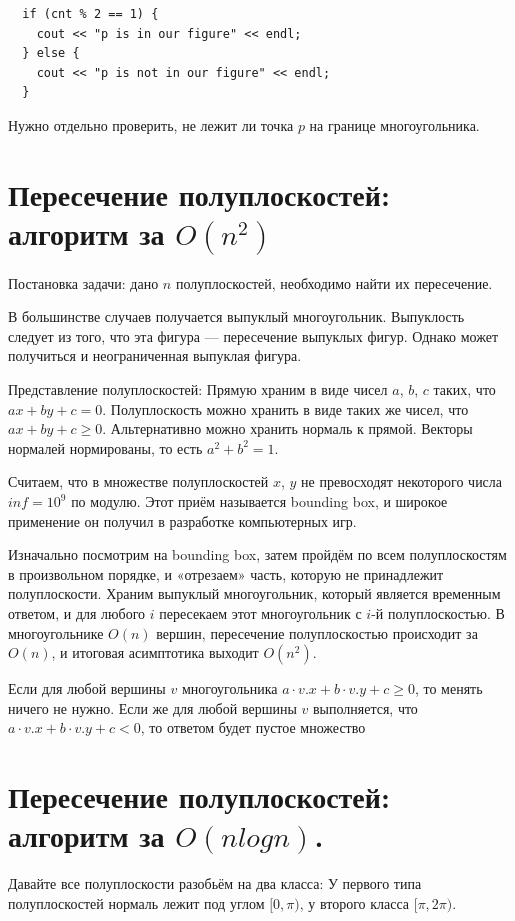 \begin{lstlisting}
  if (cnt % 2 == 1) {
    cout << "p is in our figure" << endl;
  } else {
    cout << "p is not in our figure" << endl;
  }
\end{lstlisting}

\Note Нужно отдельно проверить, не лежит ли точка $p$ на границе многоугольника.
\newpage{}

\section{Пересечение полуплоскостей: алгоритм за $O(n^2)$}
Постановка задачи: дано $n$ полуплоскостей, необходимо найти их пересечение.

В большинстве случаев получается выпуклый многоугольник. Выпуклость следует из того, что эта фигура — пересечение выпуклых фигур. Однако может получиться и неограниченная выпуклая фигура.

Представление полуплоскостей: 
Прямую храним в виде чисел $a$, $b$, $c$ таких, что $ax + by + c = 0$. Полуплоскость можно хранить в виде таких же чисел, что $ax + by + c \geqslant 0$. Альтернативно можно хранить нормаль к прямой. Векторы нормалей нормированы, то есть $a^2 + b^2 = 1$.

\Note Считаем, что в множестве полуплоскостей $x$, $y$ не превосходят некоторого числа $inf = 10^9$ по модулю. Этот приём называется bounding box, и широкое применение он получил в разработке компьютерных игр.

Изначально посмотрим на bounding box, затем пройдём по всем полуплоскостям в произвольном порядке, и «отрезаем» часть, которую не принадлежит полуплоскости. Храним выпуклый многоугольник, который является временным ответом, и для любого $i$ пересекаем этот многоугольник с $i$-й полуплоскостью. В многоугольнике $O(n)$ вершин, пересечение полуплоскостью происходит за $O(n)$, и итоговая асимптотика выходит $O(n^2)$.

Если для любой вершины $v$ многоугольника $a \cdot v.x + b \cdot v.y + c \geqslant 0$, то менять ничего не нужно. Если же для любой вершины $v$ выполняется, что $a \cdot v.x + b \cdot v.y + c < 0$, то ответом будет пустое множество

\section{Пересечение полуплоскостей: алгоритм за $O(n log n)$.}
Давайте все полуплоскости разобьём на два класса: 
У первого типа полуплоскостей нормаль лежит под углом $[0, \pi)$, у второго класса $[\pi, 2\pi)$. 


